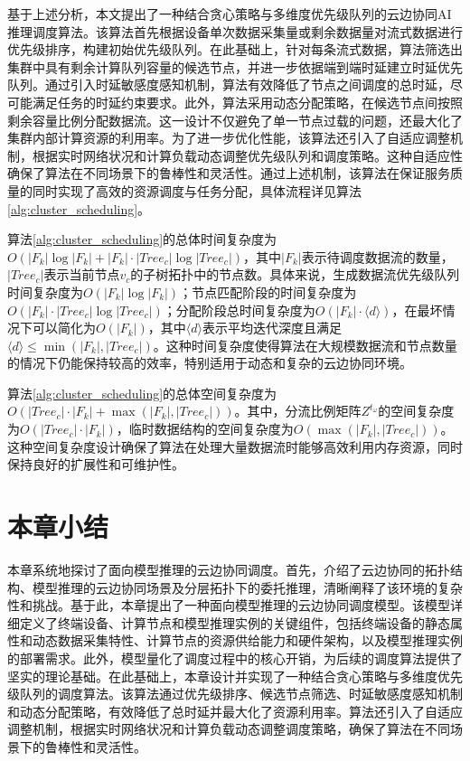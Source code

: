 基于上述分析，本文提出了一种结合贪心策略与多维度优先级队列的云边协同AI推理调度算法。该算法首先根据设备单次数据采集量或剩余数据量对流式数据进行优先级排序，构建初始优先级队列。在此基础上，针对每条流式数据，算法筛选出集群中具有剩余计算队列容量的候选节点，并进一步依据端到端时延建立时延优先队列。通过引入时延敏感度感知机制，算法有效降低了节点之间调度的总时延，尽可能满足任务的时延约束要求。此外，算法采用动态分配策略，在候选节点间按照剩余容量比例分配数据流。这一设计不仅避免了单一节点过载的问题，还最大化了集群内部计算资源的利用率。为了进一步优化性能，该算法还引入了自适应调整机制，根据实时网络状况和计算负载动态调整优先级队列和调度策略。这种自适应性确保了算法在不同场景下的鲁棒性和灵活性。通过上述机制，该算法在保证服务质量的同时实现了高效的资源调度与任务分配，具体流程详见算法\ref{alg:cluster_scheduling}。

算法\ref{alg:cluster_scheduling}的总体时间复杂度为$O(|F_k| \log |F_k| + |F_k| \cdot |Tree_c| \log |Tree_c|)$，其中$|F_k|$表示待调度数据流的数量，$|Tree_c|$表示当前节点$v_c$的子树拓扑中的节点数。具体来说，生成数据流优先级队列时间复杂度为$O(|F_k| \log |F_k|)$；节点匹配阶段的时间复杂度为$O(|F_k| \cdot |Tree_c| \log |Tree_c|)$；分配阶段总时间复杂度为$O(|F_k| \cdot \langle d \rangle)$，在最坏情况下可以简化为$O(|F_k|)$，其中$\langle d \rangle$表示平均迭代深度且满足$\langle d \rangle \leq \min(|F_k|, |Tree_c|)$。这种时间复杂度使得算法在大规模数据流和节点数量的情况下仍能保持较高的效率，特别适用于动态和复杂的云边协同环境。

算法\ref{alg:cluster_scheduling}的总体空间复杂度为$O(|Tree_c| \cdot |F_k| + \max(|F_k|, |Tree_c|))$。其中，分流比例矩阵$Z^{t_\omega}$的空间复杂度为$O(|Tree_c| \cdot |F_k|)$，临时数据结构的空间复杂度为$O(\max(|F_k|, |Tree_c|))$。这种空间复杂度设计确保了算法在处理大量数据流时能够高效利用内存资源，同时保持良好的扩展性和可维护性。

\section{本章小结}

本章系统地探讨了面向模型推理的云边协同调度。首先，介绍了云边协同的拓扑结构、模型推理的云边协同场景及分层拓扑下的委托推理，清晰阐释了该环境的复杂性和挑战。基于此，本章提出了一种面向模型推理的云边协同调度模型。该模型详细定义了终端设备、计算节点和模型推理实例的关键组件，包括终端设备的静态属性和动态数据采集特性、计算节点的资源供给能力和硬件架构，以及模型推理实例的部署需求。此外，模型量化了调度过程中的核心开销，为后续的调度算法提供了坚实的理论基础。在此基础上，本章设计并实现了一种结合贪心策略与多维度优先级队列的调度算法。该算法通过优先级排序、候选节点筛选、时延敏感度感知机制和动态分配策略，有效降低了总时延并最大化了资源利用率。算法还引入了自适应调整机制，根据实时网络状况和计算负载动态调整调度策略，确保了算法在不同场景下的鲁棒性和灵活性。
